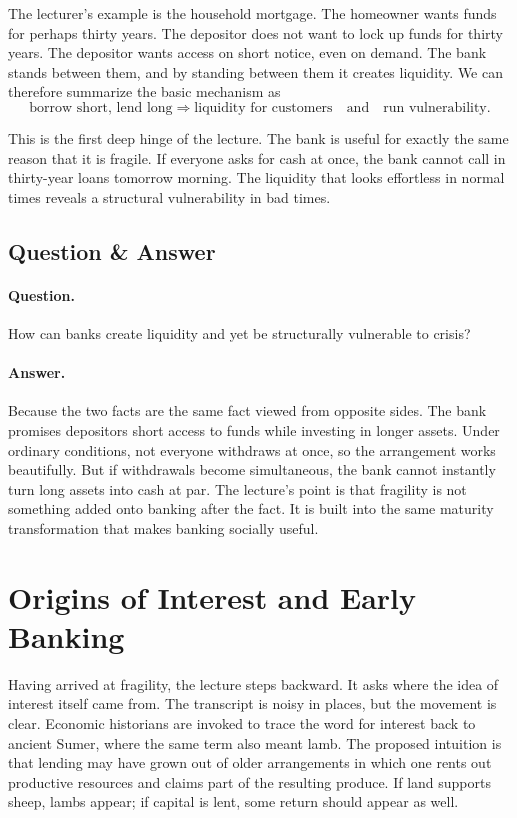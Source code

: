 The lecturer's example is the household mortgage. The homeowner wants funds for perhaps thirty years. The depositor does not want to lock up funds for thirty years. The depositor wants access on short notice, even on demand. The bank stands between them, and by standing between them it creates liquidity. We can therefore summarize the basic mechanism as
\begin{equation}
\text{borrow short, lend long}
\Rightarrow
\text{liquidity for customers}
\quad \text{and} \quad
\text{run vulnerability}.
\end{equation}

This is the first deep hinge of the lecture. The bank is useful for exactly the same reason that it is fragile. If everyone asks for cash at once, the bank cannot call in thirty-year loans tomorrow morning. The liquidity that looks effortless in normal times reveals a structural vulnerability in bad times.

\subsection{Question \& Answer}

\paragraph{Question.} How can banks create liquidity and yet be structurally vulnerable to crisis?

\paragraph{Answer.} Because the two facts are the same fact viewed from opposite sides. The bank promises depositors short access to funds while investing in longer assets. Under ordinary conditions, not everyone withdraws at once, so the arrangement works beautifully. But if withdrawals become simultaneous, the bank cannot instantly turn long assets into cash at par. The lecture's point is that fragility is not something added onto banking after the fact. It is built into the same maturity transformation that makes banking socially useful.

\section{Origins of Interest and Early Banking}

Having arrived at fragility, the lecture steps backward. It asks where the idea of interest itself came from. The transcript is noisy in places, but the movement is clear. Economic historians are invoked to trace the word for interest back to ancient Sumer, where the same term also meant lamb. The proposed intuition is that lending may have grown out of older arrangements in which one rents out productive resources and claims part of the resulting produce. If land supports sheep, lambs appear; if capital is lent, some return should appear as well.

